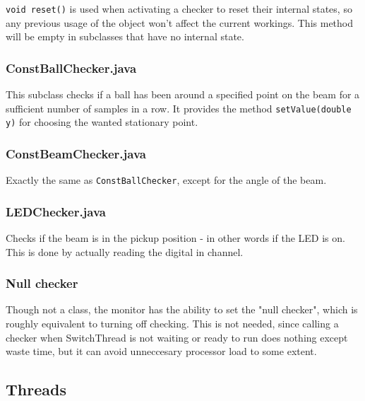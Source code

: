 \texttt{void reset()} is used when activating a checker to reset their internal states, so any previous usage of the object won't  affect the current workings. 
This method will be empty in subclasses that have no internal state.


\subsubsection{ConstBallChecker.java}
This subclass checks if a ball has been around a specified point on the beam for a sufficient number of samples in a row. 
It provides the method \texttt{setValue(double y)} for choosing the wanted stationary point.

\subsubsection{ConstBeamChecker.java}
Exactly the same as \texttt{ConstBallChecker}, except for the angle of the beam.

\subsubsection{LEDChecker.java}
Checks if the beam is in the pickup position - in other words if the LED is on. 
This is done by actually reading the digital in channel.

\subsubsection{Null checker}
Though not a class, the monitor has the ability to set the "null checker", which is roughly equivalent to turning off checking. 
This is not needed, since calling a checker when SwitchThread is not waiting or ready to run does nothing except waste time, but it can avoid unneccesary processor load to some extent.








\subsection{Threads}\label{Threads}

